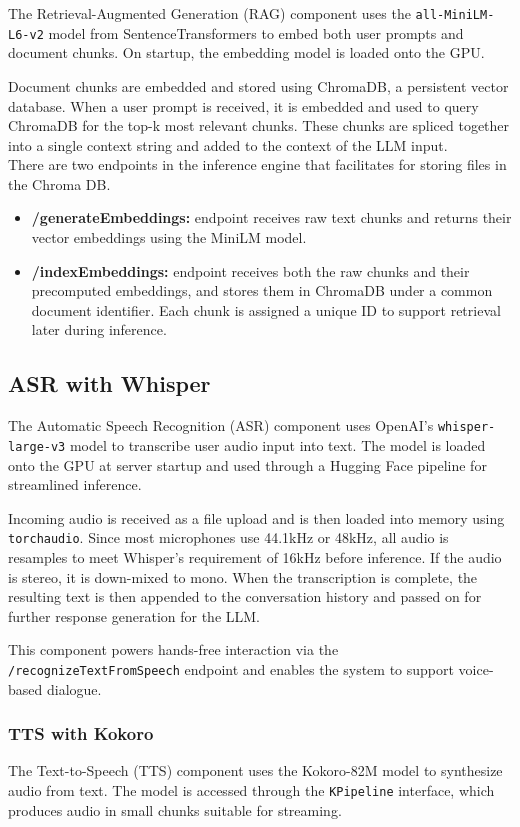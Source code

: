 \documentclass[twocolumn]{article}
\begin{document}
The Retrieval-Augmented Generation (RAG) component uses the \texttt{all-MiniLM-L6-v2} model from SentenceTransformers to embed both user prompts and document chunks. On startup, the embedding model is loaded onto the GPU.

Document chunks are embedded and stored using ChromaDB\cite{chromadb2023}, a persistent vector database. When a user prompt is received, it is embedded and used to query ChromaDB for the top-k most relevant chunks. These chunks are spliced together into a single context string and added to the context of the LLM input.\\
There are two endpoints in the inference engine that facilitates for storing files in the Chroma DB.
\begin{itemize}
    \item \textbf{/generateEmbeddings:} endpoint receives raw text chunks and returns their vector embeddings using the MiniLM model.
    \item \textbf{/indexEmbeddings:} endpoint receives both the raw chunks and their precomputed embeddings, and stores them in ChromaDB under a common document identifier. Each chunk is assigned a unique ID to support retrieval later during inference.
\end{itemize}

\subsection{ASR with Whisper}
The Automatic Speech Recognition (ASR) component uses OpenAI’s \texttt{whisper-large-v3}\cite{radford2022whisper} model to transcribe user audio input into text. The model is loaded onto the GPU at server startup and used through a Hugging Face pipeline for streamlined inference.

Incoming audio is received as a file upload and is then loaded into memory using \texttt{torchaudio}\cite{torchaudio}. Since most microphones use 44.1kHz or 48kHz, all audio is resamples to meet Whisper's requirement of 16kHz before inference. If the audio is stereo, it is down-mixed to mono. When the transcription is complete, the resulting text is then appended to the conversation history and passed on for further response generation for the LLM.

This component powers hands-free interaction via the \texttt{/recognizeTextFromSpeech} endpoint and enables the system to support voice-based dialogue.
\subsubsection{TTS with Kokoro}
The Text-to-Speech (TTS) component uses the Kokoro-82M model\cite{kokoro82m} to synthesize audio from text. The model is accessed through the \texttt{KPipeline} interface, which produces audio in small chunks suitable for streaming.
\end{document}
